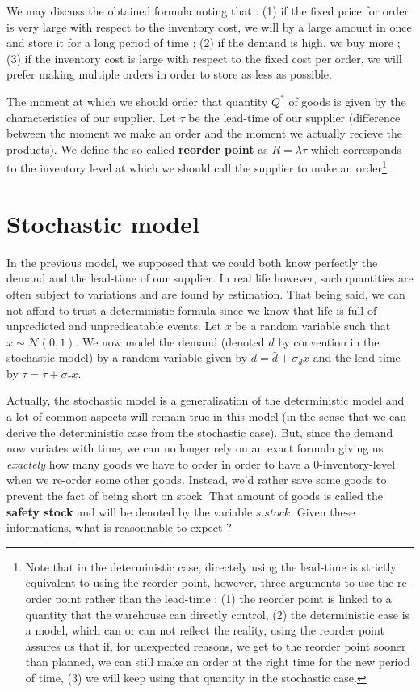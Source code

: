 We may discuss the obtained formula noting that : (1) if the fixed price for order is very large with respect to the inventory cost, we will by a large amount in once and store it for a long period of time ; (2) if the demand is high, we buy more ; (3) if the inventory cost is large with respect to the fixed cost per order, we will prefer making multiple orders in order to store as less as possible. 

The moment at which we should order that quantity $Q^*$ of goods is given by the characteristics of our supplier. Let $\tau$ be the lead-time of our supplier (difference between the moment we make an order and the moment we actually recieve the products). We define the so called \textbf{reorder point} as $R = \lambda\tau$ which corresponds to the inventory level at which we should call the supplier to make an order\footnote{Note that in the deterministic case, directely using the lead-time is strictly equivalent to using the reorder point, however, three arguments to use the re-order point rather than the lead-time : (1) the reorder point is linked to a quantity that the warehouse can directly control, (2) the deterministic case is a model, which can or can not reflect the reality, using the reorder point assures us that if, for unexpected reasons, we get to the reorder point sooner than planned, we can still make an order at the right time for the new period of time, (3) we will keep using that quantity in the stochastic case.}.

\section{Stochastic model}

In the previous model, we supposed that we could both know perfectly the demand and the lead-time of our supplier. In real life however, such quantities are often subject to variations and are found by estimation. That being said, we can not afford to trust a deterministic formula since we know that life is full of unpredicted and unpredicatable events. Let $x$ be a random variable such that $x\sim\mathcal N(0,1)$. We now model the demand (denoted $d$ by convention in the stochastic model) by a random variable given by $d=\bar d + \sigma_d x$ and the lead-time by $\tau = \bar\tau +\sigma_\tau x$. 

Actually, the stochastic model is a generalisation of the deterministic model and a lot of common aspects will remain true in this model (in the sense that we can derive the deterministic case from the stochastic case). But, since the demand now variates with time, we can no longer rely on an exact formula giving us \emph{exactely} how many goods we have to order in order to have a $0$-inventory-level when we re-order some other goods. Instead, we'd rather save some goods to prevent the fact of being short on stock. That amount of goods is called the \textbf{safety stock} and will be denoted by the variable $s.stock$. Given these informations, what is reasonnable to expect ? 

